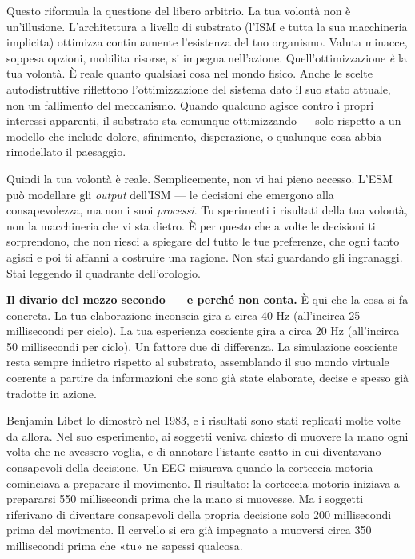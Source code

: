 \documentclass[11pt, twoside, openright]{book}
\begin{document}
Questo riformula la questione del libero arbitrio. La tua volontà non è un'illusione. L'architettura a livello di substrato (l'ISM e tutta la sua macchineria implicita) ottimizza continuamente l'esistenza del tuo organismo. Valuta minacce, soppesa opzioni, mobilita risorse, si impegna nell'azione. Quell'ottimizzazione \textit{è} la tua volontà. È reale quanto qualsiasi cosa nel mondo fisico. Anche le scelte autodistruttive riflettono l'ottimizzazione del sistema dato il suo stato attuale, non un fallimento del meccanismo. Quando qualcuno agisce contro i propri interessi apparenti, il substrato sta comunque ottimizzando --- solo rispetto a un modello che include dolore, sfinimento, disperazione, o qualunque cosa abbia rimodellato il paesaggio.

Quindi la tua volontà è reale. Semplicemente, non vi hai pieno accesso. L'ESM può modellare gli \textit{output} dell'ISM --- le decisioni che emergono alla consapevolezza, ma non i suoi \textit{processi}. Tu sperimenti i risultati della tua volontà, non la macchineria che vi sta dietro. È per questo che a volte le decisioni ti sorprendono, che non riesci a spiegare del tutto le tue preferenze, che ogni tanto agisci e poi ti affanni a costruire una ragione. Non stai guardando gli ingranaggi. Stai leggendo il quadrante dell'orologio.

\textbf{Il divario del mezzo secondo --- e perché non conta.} È qui che la cosa si fa concreta. La tua elaborazione inconscia gira a circa 40 Hz (all'incirca 25 millisecondi per ciclo). La tua esperienza cosciente gira a circa 20 Hz (all'incirca 50 millisecondi per ciclo). Un fattore due di differenza. La simulazione cosciente resta sempre indietro rispetto al substrato, assemblando il suo mondo virtuale coerente a partire da informazioni che sono già state elaborate, decise e spesso già tradotte in azione.

Benjamin Libet lo dimostrò nel 1983, e i risultati sono stati replicati molte volte da allora. Nel suo esperimento, ai soggetti veniva chiesto di muovere la mano ogni volta che ne avessero voglia, e di annotare l'istante esatto in cui diventavano consapevoli della decisione. Un EEG misurava quando la corteccia motoria cominciava a preparare il movimento. Il risultato: la corteccia motoria iniziava a prepararsi 550 millisecondi prima che la mano si muovesse. Ma i soggetti riferivano di diventare consapevoli della propria decisione solo 200 millisecondi prima del movimento. Il cervello si era già impegnato a muoversi circa 350 millisecondi prima che «tu» ne sapessi qualcosa.
\end{document}
